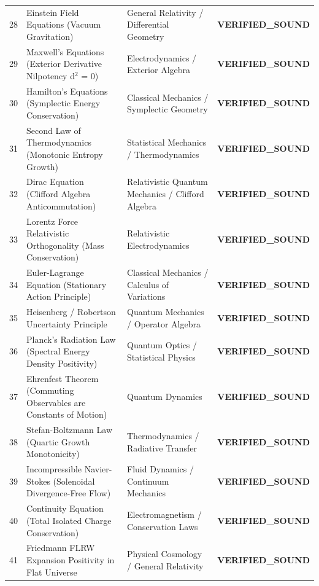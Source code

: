 \documentclass[10pt,a4paper]{article}
\begin{document}
\begin{longtable}{p{0.6cm} p{6.8cm} p{4.0cm} p{3.2cm}}
28 & Einstein Field Equations (Vacuum Gravitation) & General Relativity / Differential Geometry & \textcolor{green!70!black}{\textbf{VERIFIED\_SOUND}} \\
29 & Maxwell's Equations (Exterior Derivative Nilpotency d$^2$ = 0) & Electrodynamics / Exterior Algebra & \textcolor{green!70!black}{\textbf{VERIFIED\_SOUND}} \\
30 & Hamilton's Equations (Symplectic Energy Conservation) & Classical Mechanics / Symplectic Geometry & \textcolor{green!70!black}{\textbf{VERIFIED\_SOUND}} \\
31 & Second Law of Thermodynamics (Monotonic Entropy Growth) & Statistical Mechanics / Thermodynamics & \textcolor{green!70!black}{\textbf{VERIFIED\_SOUND}} \\
32 & Dirac Equation (Clifford Algebra Anticommutation) & Relativistic Quantum Mechanics / Clifford Algebra & \textcolor{green!70!black}{\textbf{VERIFIED\_SOUND}} \\
33 & Lorentz Force Relativistic Orthogonality (Mass Conservation) & Relativistic Electrodynamics & \textcolor{green!70!black}{\textbf{VERIFIED\_SOUND}} \\
34 & Euler-Lagrange Equation (Stationary Action Principle) & Classical Mechanics / Calculus of Variations & \textcolor{green!70!black}{\textbf{VERIFIED\_SOUND}} \\
35 & Heisenberg / Robertson Uncertainty Principle & Quantum Mechanics / Operator Algebra & \textcolor{green!70!black}{\textbf{VERIFIED\_SOUND}} \\
36 & Planck's Radiation Law (Spectral Energy Density Positivity) & Quantum Optics / Statistical Physics & \textcolor{green!70!black}{\textbf{VERIFIED\_SOUND}} \\
37 & Ehrenfest Theorem (Commuting Observables are Constants of Motion) & Quantum Dynamics & \textcolor{green!70!black}{\textbf{VERIFIED\_SOUND}} \\
38 & Stefan-Boltzmann Law (Quartic Growth Monotonicity) & Thermodynamics / Radiative Transfer & \textcolor{green!70!black}{\textbf{VERIFIED\_SOUND}} \\
39 & Incompressible Navier-Stokes (Solenoidal Divergence-Free Flow) & Fluid Dynamics / Continuum Mechanics & \textcolor{green!70!black}{\textbf{VERIFIED\_SOUND}} \\
40 & Continuity Equation (Total Isolated Charge Conservation) & Electromagnetism / Conservation Laws & \textcolor{green!70!black}{\textbf{VERIFIED\_SOUND}} \\
41 & Friedmann FLRW Expansion Positivity in Flat Universe & Physical Cosmology / General Relativity & \textcolor{green!70!black}{\textbf{VERIFIED\_SOUND}} \\

\end{longtable}
\end{document}
